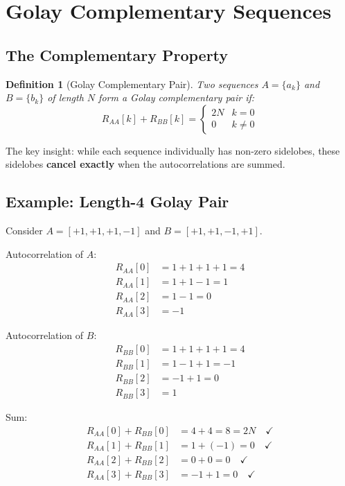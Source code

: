 \documentclass[11pt]{article}
\newtheorem{definition}{Definition}
\begin{document}
\section{Golay Complementary Sequences}

\subsection{The Complementary Property}

\begin{definition}[Golay Complementary Pair]
Two sequences $A = \{a_k\}$ and $B = \{b_k\}$ of length $N$ form a Golay complementary pair if:
\begin{equation}
R_{AA}[k] + R_{BB}[k] = \begin{cases}
2N & k = 0 \\
0 & k \neq 0
\end{cases}
\end{equation}
\end{definition}

The key insight: while each sequence individually has non-zero sidelobes, these sidelobes \textbf{cancel exactly} when the autocorrelations are summed.

\subsection{Example: Length-4 Golay Pair}

Consider $A = [+1, +1, +1, -1]$ and $B = [+1, +1, -1, +1]$.

Autocorrelation of $A$:
\begin{align*}
R_{AA}[0] &= 1+1+1+1 = 4 \\
R_{AA}[1] &= 1+1-1 = 1 \\
R_{AA}[2] &= 1-1 = 0 \\
R_{AA}[3] &= -1
\end{align*}

Autocorrelation of $B$:
\begin{align*}
R_{BB}[0] &= 1+1+1+1 = 4 \\
R_{BB}[1] &= 1-1+1 = -1 \\
R_{BB}[2] &= -1+1 = 0 \\
R_{BB}[3] &= 1
\end{align*}

Sum:
\begin{align*}
R_{AA}[0] + R_{BB}[0] &= 4 + 4 = 8 = 2N \quad \checkmark \\
R_{AA}[1] + R_{BB}[1] &= 1 + (-1) = 0 \quad \checkmark \\
R_{AA}[2] + R_{BB}[2] &= 0 + 0 = 0 \quad \checkmark \\
R_{AA}[3] + R_{BB}[3] &= -1 + 1 = 0 \quad \checkmark
\end{align*}
\end{document}
